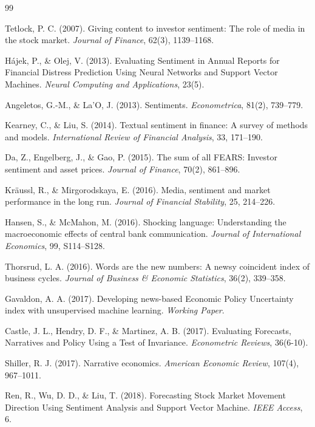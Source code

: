 \documentclass[11pt]{article}
\begin{document}
\begin{thebibliography}{99}

 Tetlock, P. C. (2007). Giving content to investor sentiment: The role of media in the stock market. \textit{Journal of Finance}, 62(3), 1139--1168.

 Hájek, P., \& Olej, V. (2013). Evaluating Sentiment in Annual Reports for Financial Distress Prediction Using Neural Networks and Support Vector Machines. \textit{Neural Computing and Applications}, 23(5).

 Angeletos, G.-M., \& La'O, J. (2013). Sentiments. \textit{Econometrica}, 81(2), 739--779.

 Kearney, C., \& Liu, S. (2014). Textual sentiment in finance: A survey of methods and models. \textit{International Review of Financial Analysis}, 33, 171--190.

 Da, Z., Engelberg, J., \& Gao, P. (2015). The sum of all FEARS: Investor sentiment and asset prices. \textit{Journal of Finance}, 70(2), 861--896.

 Kräussl, R., \& Mirgorodskaya, E. (2016). Media, sentiment and market performance in the long run. \textit{Journal of Financial Stability}, 25, 214--226.

 Hansen, S., \& McMahon, M. (2016). Shocking language: Understanding the macroeconomic effects of central bank communication. \textit{Journal of International Economics}, 99, S114--S128.

 Thorsrud, L. A. (2016). Words are the new numbers: A newsy coincident index of business cycles. \textit{Journal of Business \& Economic Statistics}, 36(2), 339--358.

 Gavaldon, A. A. (2017). Developing news-based Economic Policy Uncertainty index with unsupervised machine learning. \textit{Working Paper}.

 Castle, J. L., Hendry, D. F., \& Martinez, A. B. (2017). Evaluating Forecasts, Narratives and Policy Using a Test of Invariance. \textit{Econometric Reviews}, 36(6-10).

 Shiller, R. J. (2017). Narrative economics. \textit{American Economic Review}, 107(4), 967--1011.

 Ren, R., Wu, D. D., \& Liu, T. (2018). Forecasting Stock Market Movement Direction Using Sentiment Analysis and Support Vector Machine. \textit{IEEE Access}, 6.


\end{thebibliography}
\end{document}
